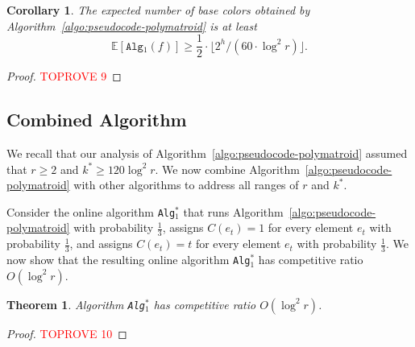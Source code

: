 \documentclass[11pt]{article}
\newtheorem{theorem}{Theorem}
\newtheorem{corollary}{Corollary}
\theoremstyle{definition}
\begin{document}
\begin{corollary}\label{corollary:number-proper-colors}
    The expected number of base colors obtained by Algorithm~\ref{algo:pseudocode-polymatroid} is at least $$\mathbb{E}[\texttt{Alg$_1$}(f)]\geq \frac{1}{2}\cdot \lfloor 2^h/ (60\cdot \log^2 r)\rfloor.$$
\end{corollary}
\begin{proof}\textcolor{red}{TOPROVE 9}\end{proof}



\subsection{Combined Algorithm}\label{subsection:mixed-algorithm}
We recall that our analysis of Algorithm~\ref{algo:pseudocode-polymatroid} assumed that $r\geq 2$ and $k^*\geq 120\log^2 r$. We now combine Algorithm~\ref{algo:pseudocode-polymatroid} with other algorithms to address all ranges of $r$ and $k^*$.

Consider the online algorithm \texttt{Alg$_1^*$} that runs Algorithm~\ref{algo:pseudocode-polymatroid} with probability $\frac{1}{3}$, assigns $C(e_t)=1$ for every element $e_t$ with probability $\frac{1}{3}$, and assigns $C(e_t)=t$ for every element $e_t$ with probability $\frac{1}{3}$. We now show that the resulting online algorithm \texttt{Alg$_1^*$} has competitive ratio $O(\log^2 r)$.

\begin{theorem}\label{theorem:polymatroid-combined-ratio}
    Algorithm \texttt{Alg$_1^*$} has competitive ratio $O(\log^2 r)$.
\end{theorem}
\begin{proof}\textcolor{red}{TOPROVE 10}\end{proof}
\end{document}
